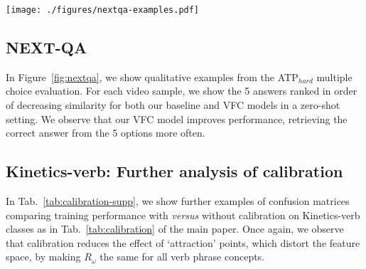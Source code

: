 \clearpage

\begin{figure*}[!ht]
    \centering
    \texttt{[image: ./figures/nextqa-examples.pdf]}
    \vspace{0.5cm}
    \caption{\textbf{NEXT-QA:} We show qualitative examples from the ATP$_{hard}$ \cite{buch2022revisiting} multiple choice evaluation. For ease of visualisation, we only show a single frame per video. For each video sample, we show the 5 answers ranked in order of decreasing similarity for both our baseline and VFC models in a zero-shot setting. We observe that our VFC model improves performance, retrieving the correct answer from the 5 options more often.}
    \label{fig:nextqa}
\end{figure*} 






\subsection{NEXT-QA}\label{sec:app:next-qa}
In Figure~\ref{fig:nextqa}, we show qualitative examples from the ATP$_{hard}$ \cite{buch2022revisiting} multiple choice evaluation. For each video sample, we show the 5 answers ranked in order of decreasing similarity for both our baseline and VFC models in a zero-shot setting. We observe that our VFC model improves performance, retrieving the correct answer from the 5 options more often.




\subsection{Kinetics-verb: Further analysis of calibration}\label{sec:app:calibration}
In Tab.~\ref{tab:calibration-supp}, we show further examples of confusion matrices comparing training performance with \textit{versus} without calibration on Kinetics-verb classes as in Tab.~\ref{tab:calibration} of the main paper. Once again, we observe that calibration reduces the effect of `attraction' points, which distort the feature space, by making $R_\omega$ the same for all verb phrase concepts.

